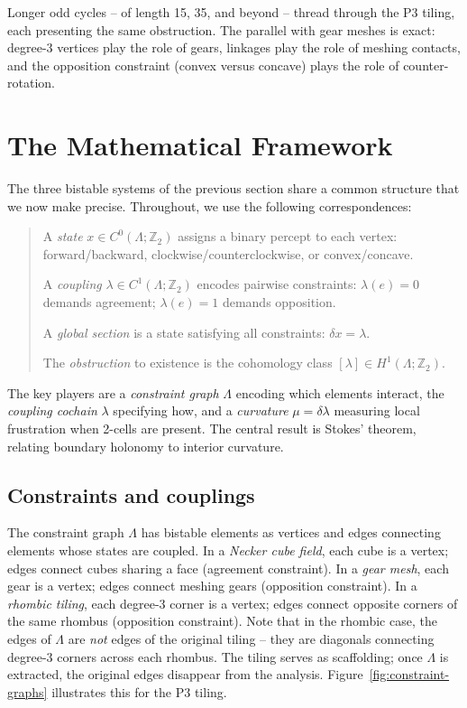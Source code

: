 \documentclass[11pt]{amsart}  %
\theoremstyle{plain}
\theoremstyle{definition}
\theoremstyle{remark}
\newcommand{\style}[1]{{\em #1}} %
\newcommand{\coboundary}{\delta} %
\newcommand{\Z}{\mathbb{Z}} %
\newcommand{\cgraph}{\Lambda} %
\newcommand{\coupling}{\lambda} %
\begin{document}
Longer odd cycles -- of length 15, 35, and beyond -- thread through the P3 tiling, each presenting the same obstruction. The parallel with gear meshes is exact: degree-3 vertices play the role of gears, linkages play the role of meshing contacts, and the opposition constraint (convex versus concave) plays the role of counter-rotation. 

\section{The Mathematical Framework}
\label{sec:framework}

The three bistable systems of the previous section share a common structure that we now make precise. Throughout, we use the following correspondences:
%
\begin{quote}
A \style{state} $x \in C^0(\cgraph; \Z_2)$ assigns a binary percept to each vertex: forward/backward, clockwise/counterclockwise, or convex/concave.

A \style{coupling} $\coupling \in C^1(\cgraph; \Z_2)$ encodes pairwise constraints: $\coupling(e) = 0$ demands agreement; $\coupling(e) = 1$ demands opposition.

A \style{global section} is a state satisfying all constraints: $\coboundary x = \coupling$.

The \style{obstruction} to existence is the cohomology class $[\coupling] \in H^1(\cgraph; \Z_2)$.
\end{quote}
%
The key players are a \style{constraint graph} $\cgraph$ encoding which elements interact, the \style{coupling cochain} $\coupling$ specifying how, and a \style{curvature} $\mu = \coboundary\coupling$ measuring local frustration when 2-cells are present. The central result is Stokes' theorem, relating boundary holonomy to interior curvature.


\subsection{Constraints and couplings}
\label{sec:coupling}

The constraint graph $\cgraph$ has bistable elements as vertices and edges connecting elements whose states are coupled. In a \emph{Necker cube field}, each cube is a vertex; edges connect cubes sharing a face (agreement constraint). In a \emph{gear mesh}, each gear is a vertex; edges connect meshing gears (opposition constraint). In a \emph{rhombic tiling}, each degree-3 corner is a vertex; edges connect opposite corners of the same rhombus (opposition constraint). Note that in the rhombic case, the edges of $\cgraph$ are \emph{not} edges of the original tiling -- they are diagonals connecting degree-3 corners across each rhombus. The tiling serves as scaffolding; once $\cgraph$ is extracted, the original edges disappear from the analysis. Figure~\ref{fig:constraint-graphs} illustrates this for the P3 tiling.
\end{document}
